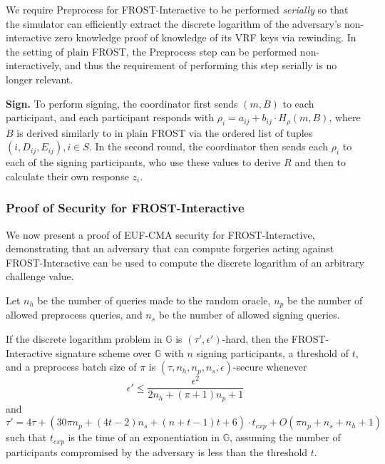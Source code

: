 We require Preprocess for FROST-Interactive to be performed
\emph{serially} so that the simulator can efficiently extract the discrete
logarithm of the adversary's non-interactive zero knowledge proof of knowledge
of its VRF keys
via rewinding. In the setting of plain FROST, the Preprocess step can be
performed non-interactively, and thus the
requirement of performing this step serially is no longer relevant.

\textbf{Sign.} To perform signing, the coordinator first sends $(m, B)$ to each participant, and each
participant responds with $\rho_i = a_{ij} + b_{ij} \cdot H_{\rho}(m, B)$,
where $B$ is derived similarly to in plain FROST via the ordered list of tuples
$(i, D_{ij}, E_{ij}), i \in S$. In the second round, the coordinator then sends each
$\rho_i$ to each of the signing participants, who use these values to
derive $R$ and then to calculate their own response $z_i$.





\subsubsection{Proof of Security for FROST-Interactive}

We now present a proof of EUF-CMA security for
FROST-Interactive, demonstrating that an adversary that can compute
forgeries acting against FROST-Interactive can be used to compute the
discrete logarithm of an arbitrary challenge value.

Let
$n_h$ be the number of queries made to the random oracle,
$n_p$ be the number of allowed preprocess queries, and
$n_s$ be the number of allowed signing queries.

\begin{theorem}\label{thm:parallel-appendix}
  If the discrete logarithm problem in $\mathbb{G}$ is $(\tau', \epsilon')$-hard,
  then the FROST-Interactive signature scheme over $\mathbb{G}$
  with $n$ signing participants, a threshold of $t$, and a preprocess batch size of $\pi$
  is $(\tau, n_h, n_p, n_s, \epsilon)$-secure whenever
  \[
    \epsilon' \leq \frac{\epsilon^2}{2 n_h + (\pi+1) n_p + 1}
  \]
  and
  \[
    \tau' = 4\tau + (30\pi n_p + (4t-2)n_s + (n+t-1)t + 6) \cdot t_{exp} + O(\pi n_p + n_s + n_h + 1)
  \]
  such that $t_{exp}$ is the time of an exponentiation in $\mathbb{G}$,
  assuming the number of participants compromised by the adversary is less than
  the threshold $t$.
\end{theorem}

